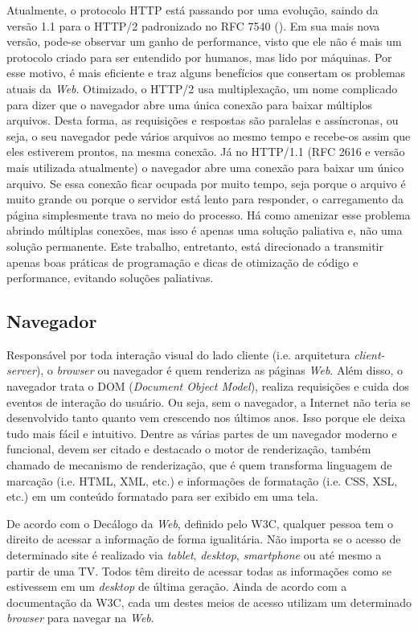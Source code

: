 Atualmente, o protocolo HTTP está passando por uma evolução, saindo da versão 1.1 para o HTTP/2 padronizado no RFC 7540 (\cite{rfc7540}). Em sua mais nova versão, pode-se observar um ganho de performance, visto que ele não é mais um protocolo criado para ser entendido por humanos, mas lido por máquinas. Por esse motivo, é mais eficiente e traz alguns benefícios que consertam os problemas atuais da \textit{Web}. Otimizado, o HTTP/2 usa multiplexação, um nome complicado para dizer que o navegador abre uma única conexão para baixar múltiplos arquivos. Desta forma, as requisições e respostas são paralelas e assíncronas, ou seja, o seu navegador pede vários arquivos ao mesmo tempo e recebe-os assim que eles estiverem prontos, na mesma conexão. Já no HTTP/1.1 (RFC 2616 e versão mais utilizada atualmente) o navegador abre uma conexão para baixar um único arquivo. Se essa conexão ficar ocupada por muito tempo, seja porque o arquivo é muito grande ou porque o servidor está lento para responder, o carregamento da página simplesmente trava no meio do processo. Há como amenizar esse problema abrindo múltiplas conexões, mas isso é apenas uma solução paliativa e, não uma solução permanente. Este trabalho, entretanto, está direcionado a transmitir apenas boas práticas de programação e dicas de otimização de código e performance, evitando soluções paliativas.
%
%
%
\subsection{Navegador}
\label{SubNavegador}

Responsável por toda interação visual do lado cliente (i.e. arquitetura \textit{client-server}), o \textit{browser} ou navegador é quem renderiza as páginas \textit{Web}. Além disso, o navegador trata o DOM (\textit{Document Object Model}), realiza requisições e cuida dos eventos de interação do usuário. Ou seja, sem o navegador, a Internet não teria se desenvolvido tanto quanto vem crescendo nos últimos anos. Isso porque ele deixa tudo mais fácil e intuitivo. Dentre as várias partes de um navegador moderno e funcional, devem ser citado e destacado o motor de renderização, também chamado de mecanismo de renderização, que é quem transforma linguagem de marcação (i.e. HTML, XML, etc.) e informações de formatação (i.e. CSS, XSL, etc.) em um conteúdo formatado para ser exibido em uma tela.

De acordo com o Decálogo da \textit{Web}, definido pelo W3C, qualquer pessoa tem o direito de acessar a informação de forma igualitária. Não importa se o acesso de determinado site é realizado via \textit{tablet}, \textit{desktop}, \textit{smartphone} ou até mesmo a partir de uma TV. Todos têm direito de acessar todas as informações como se estivessem em um \textit{desktop} de última geração. Ainda de acordo com a documentação da W3C, cada um destes meios de acesso utilizam um determinado \textit{browser} para navegar na \textit{Web}.

